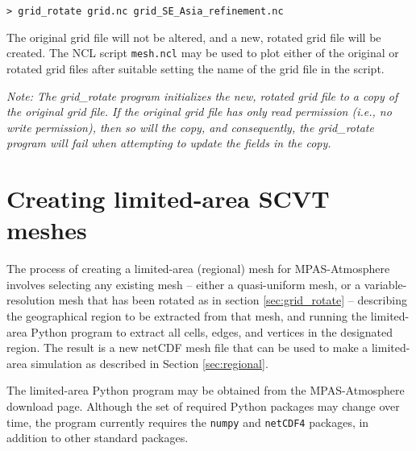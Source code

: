 \vspace{12pt}
{\tt > grid\_rotate grid.nc grid\_SE\_Asia\_refinement.nc}
\vspace{12pt}

The original grid file will not be altered, and a new, rotated grid file will be
created. The NCL script {\tt mesh.ncl} may be used to plot either of the
original or rotated grid files after suitable setting the name of the grid file
in the script.

\vspace{12pt}
{\em Note: The grid\_rotate program initializes the new, rotated grid file to a copy of the original grid file.
If the original grid file has only read permission (i.e., no write permission), then so will the copy, and
consequently, the grid\_rotate program will fail when attempting to update the fields in the copy.}


\section{Creating limited-area SCVT meshes}
\label{sec:mesh_subset} 

The process of creating a limited-area (regional) mesh for MPAS-Atmosphere involves
selecting any existing mesh -- either a quasi-uniform mesh, or a variable-resolution mesh
that has been rotated as in section \ref{sec:grid_rotate} -- describing the geographical
region to be extracted from that mesh, and running the limited-area Python program to extract
all cells, edges, and vertices in the designated region. The result is a new netCDF mesh file that can
be used to make a limited-area simulation as described in Section \ref{sec:regional}.

The limited-area Python program may be obtained from the MPAS-Atmosphere download page. Although
the set of required Python packages may change over time, the program currently requires
the {\tt numpy} and {\tt netCDF4} packages, in addition to other standard packages.
